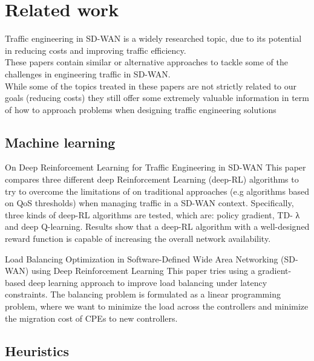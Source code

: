 \section{Related work}

Traffic engineering in SD-WAN is a widely researched topic, due to its potential in reducing costs and improving traffic efficiency. \\
These papers contain similar or alternative approaches to tackle some of the challenges in engineering traffic in SD-WAN. \\
While some of the topics treated in these papers are not strictly related to our goals (reducing costs) they still offer some extremely valuable information in term of how to approach problems when designing traffic engineering solutions

\subsection{Machine learning}

\paperEntry 
{On Deep Reinforcement Learning for Traffic Engineering in SD-WAN \cite{on_deep_reinforcement_learning} }
{This paper compares three different deep Reinforcement Learning (deep-RL) algorithms to try to overcome the limitations of on traditional approaches (e.g algorithms based on QoS thresholds) when managing traffic in a SD-WAN context. Specifically, three kinds of deep-RL algorithms are tested, which are: policy gradient, TD- λ and deep Q-learning. Results show that a deep-RL algorithm with a well-designed reward function is capable of increasing the overall network availability.}

\paperEntry
{Load Balancing Optimization in Software-Defined Wide Area Networking (SD-WAN) using Deep Reinforcement Learning \cite{load_balancing_optimization}}
{This paper tries using a gradient-based deep learning approach to improve load balancing under latency constraints. The balancing problem is formulated as a linear programming problem, where we want to minimize the load across the controllers and minimize the migration cost of CPEs to new controllers.}		   

\subsection{Heuristics}

